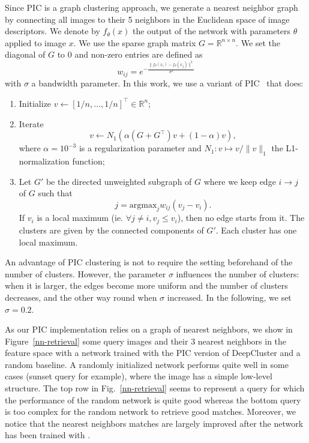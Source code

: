 Since PIC is a graph clustering approach, we generate a nearest neighbor graph by connecting all images to their 5 neighbors in the Euclidean space of image descriptors. 
We denote by $f_\theta(x)$ the output of the network with parameters $\theta$ applied to image $x$. 
We use the sparse graph matrix $G=\mathbb{R}^{n \times n}$. 
We set the diagonal of $G$ to 0 and non-zero entries are defined as 
\[
w_{ij} = e^{-\frac{\|f_\theta(x_i) - f_\theta(x_j)\|^2}{\sigma^2}}
\]
with $\sigma$ a bandwidth parameter.
In this work, we use a variant of PIC~\cite{douze2017evaluation,CL12} that does: 
\begin{enumerate}
\item 
	Initialize $v \leftarrow [1/n,..., 1/n]^\top \in \mathbb{R}^n$;
\item  
	Iterate \[
	v \leftarrow N_1(\alpha (G + G^\top) v + (1 - \alpha) v),
	\]
	where $\alpha = 10^{-3}$ is a regularization parameter and $N_1:v \mapsto v / \|v\|_1$ the L1-normalization function; 
\item 
	Let $G'$ be the directed unweighted subgraph of $G$ where we keep edge $i \rightarrow j$ of $G$ such that 
	\[
	j = \mathrm{argmax}_j w_{ij}(v_j - v_i). 
	\] 
	If $v_i$ is a local maximum (ie. $\forall j\ne i, v_j \le v_i$), then no edge starts from it. 
	The clusters are given by the connected components of $G'$. 
	Each cluster has one local maximum. 
\end{enumerate}

An advantage of PIC clustering is not to require the setting beforehand of the number of clusters.
However, the parameter $\sigma$ influences the number of clusters: when it is larger, the edges become more uniform and the number of clusters decreases, and the other way round when $\sigma$ increased. 
In the following, we set $\sigma=0.2$.

As our PIC implementation relies on a graph of nearest neighbors, we show in Figure~\ref{nn-retrieval} some query images and their $3$ nearest neighbors in the feature space with a network trained with the PIC version of DeepCluster and a random baseline.
A randomly initialized network performs quite well in some cases (sunset query for example), where the image has a simple low-level structure.
The top row in Fig.~\ref{nn-retrieval} seems to represent a query for which the performance of the random network is quite good whereas the bottom query is too complex for the random network to retrieve good matches.
Moreover, we notice that the nearest neighbors matches are largely improved after the network has been trained with \OURS.

